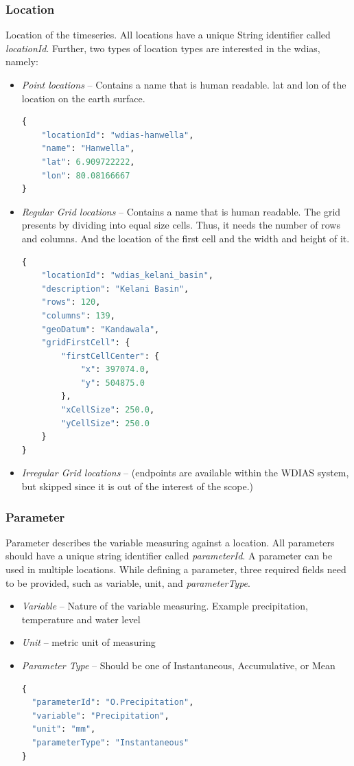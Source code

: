 \subsubsection{Location}
Location of the timeseries. All locations have a unique String identifier called \emph{locationId}. Further, two types of location types are interested in the \acrshort{wdias}, namely:
\begin{itemize}
  \item \emph{Point locations} -- Contains a name that is human readable. lat and lon of the location on the earth surface.
\begin{lstlisting}[language=Python]
{
    "locationId": "wdias-hanwella",
    "name": "Hanwella",
    "lat": 6.909722222,
    "lon": 80.08166667
}
\end{lstlisting}
  \item \emph{Regular Grid locations} -- Contains a name that is human readable. The grid presents by dividing into equal size cells. Thus, it needs the number of rows and columns. 
  And the location of the first cell and the width and height of it.
\begin{lstlisting}[language=Python]
{
    "locationId": "wdias_kelani_basin",
    "description": "Kelani Basin",
    "rows": 120,
    "columns": 139,
    "geoDatum": "Kandawala",
    "gridFirstCell": {
        "firstCellCenter": {
            "x": 397074.0,
            "y": 504875.0
        },
        "xCellSize": 250.0,
        "yCellSize": 250.0
    }
}
\end{lstlisting}
  \item \emph{Irregular Grid locations} -- (endpoints are available within the WDIAS system, but skipped since it is out of the interest of the scope.)
\end{itemize}

\subsubsection{Parameter}
Parameter describes the variable measuring against a location. All parameters should have a unique string identifier called \emph{parameterId}. A parameter can be used in multiple locations. While defining a parameter, three required fields need to be provided, such as variable, unit, and \emph{parameterType}.

\begin{itemize}  
  \item \emph{Variable} -- Nature of the variable measuring. Example precipitation, temperature and water level
  \item \emph{Unit} -- metric unit of measuring
  \item \emph{Parameter Type} -- Should be one of Instantaneous, Accumulative, or Mean
\begin{lstlisting}[language=Python]
{
  "parameterId": "O.Precipitation",
  "variable": "Precipitation",
  "unit": "mm",
  "parameterType": "Instantaneous"
}
\end{lstlisting}
\end{itemize}


